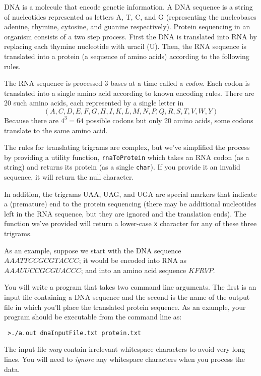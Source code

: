 \documentclass[12pt]{scrartcl}
\begin{document}
DNA is a molecule that encode genetic information.  A DNA sequence is 
a string of nucleotides represented as letters A, T, C, and G (representing
the nucleobases adenine, thymine, cytosine, and guanine respectively).  
Protein sequencing in an organism consists of a two step process.  First 
the DNA is translated into RNA by replacing each thymine nucleotide with 
uracil (U).  Then, the RNA sequence is translated into a protein (a sequence
of amino acids) according to the following rules.

The RNA sequence is processed 3 bases at a time called a \emph{codon}.  
Each codon is translated into a single amino acid according to known 
encoding rules.  There are 20 such amino acids, each represented by a 
single letter in 
 $$(A,C,D,E,F,G,H,I,K,L,M,N,P,Q,R,S,T,V,W,Y)$$
Because there are $4^3 = 64$ possible codons but only 20 amino acids,
some codons translate to the same amino acid.

The rules for translating trigrams are complex, but we've simplified
the process by providing a utility function, \texttt{rnaToProtein}
which takes an RNA codon (as a string) and returns its protein (as a 
single \texttt{char}).  If you provide it an invalid sequence, it
will return \texttt{\0} the null character.

In addition, the trigrams UAA, UAG, and UGA are special markers that 
indicate a (premature) end to the protein sequencing (there may be 
additional nucleotides left in the RNA sequence, but they are ignored 
and the translation ends).  The function we've provided will
return a lower-case \texttt{x} character for any of these three 
trigrams.

As an example, suppose we start with the DNA sequence $AAATTCCGCGTACCC$; 
it would be encoded into RNA as $AAAUUCCGCGUACCC$; and into an amino 
acid sequence $KFRVP$.

You will write a program that takes two command line arguments.  The
first is an input file containing a DNA sequence and the second is the
name of the output file in which you'll place the translated protein
sequence.  As an example, your program should be executable from the 
command line as:

\texttt{~>./a.out dnaInputFile.txt protein.txt}

The input file \emph{may} contain irrelevant whitespace characters to
avoid very long lines.  You will need to \emph{ignore} any whitespace
characters when you process the data.  
\end{document}
